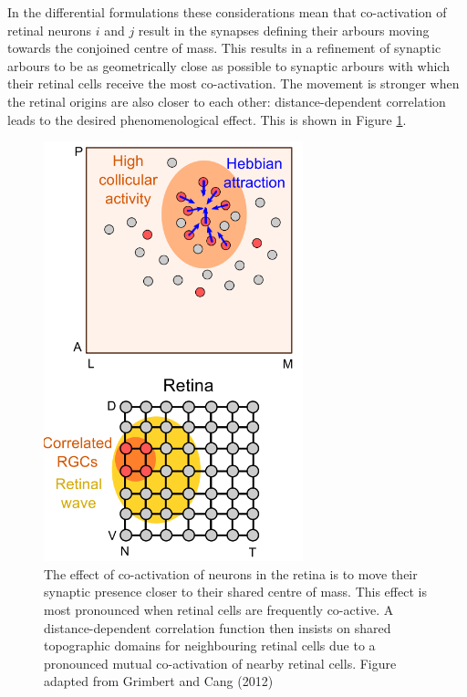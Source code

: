 In the differential formulations these considerations mean that co-activation of retinal neurons $i$ and $j$ result in the synapses defining their arbours moving towards the conjoined centre of mass. This results in a refinement of synaptic arbours to be as geometrically close as possible to synaptic arbours with which their retinal cells receive the most co-activation. The movement is stronger when the retinal origins are also closer to each other: distance-dependent correlation leads to the desired phenomenological effect. This is shown in Figure \ref{fig:activityattraction}.
\begin{figure}[h!]
	\centering
	\includegraphics[width = 0.67\textwidth]{images/introduction/cang_attraction}
	\def\c{The effect of co-activation of neurons in the retina is to move their synaptic presence closer to their shared centre of mass. }
	\caption[\c]{\c This effect is most pronounced when retinal cells are frequently co-active. A distance-dependent correlation function then insists on shared topographic domains for neighbouring retinal cells due to a pronounced mutual co-activation of nearby retinal cells. Figure adapted from Grimbert and Cang (2012) \cite{Grimbert2012-cd} \label{fig:activityattraction}} 
\end{figure}


